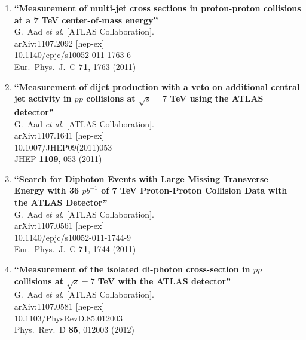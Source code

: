 \documentclass{article}
\begin{document}
\begin{enumerate}
\item%
{\bf ``Measurement of multi-jet cross sections in proton-proton collisions at a 7 TeV center-of-mass energy''}
  \\{}G.~Aad {\it et al.}  [ATLAS Collaboration].
  \\{}arXiv:1107.2092 [hep-ex]
    \\{}10.1140/epjc/s10052-011-1763-6
\\{}Eur.\ Phys.\ J.\ C {\bf 71}, 1763 (2011) %


\item%
{\bf ``Measurement of dijet production with a veto on additional central jet activity in $pp$ collisions at $\sqrt{s}=7$ TeV using the ATLAS detector''}
  \\{}G.~Aad {\it et al.}  [ATLAS Collaboration].
  \\{}arXiv:1107.1641 [hep-ex]
    \\{}10.1007/JHEP09(2011)053
\\{}JHEP {\bf 1109}, 053 (2011) %


\item%
{\bf ``Search for Diphoton Events with Large Missing Transverse Energy with 36 $pb^{-1}$ of 7 TeV Proton-Proton Collision Data with the ATLAS Detector''}
  \\{}G.~Aad {\it et al.}  [ATLAS Collaboration].
  \\{}arXiv:1107.0561 [hep-ex]
    \\{}10.1140/epjc/s10052-011-1744-9
\\{}Eur.\ Phys.\ J.\ C {\bf 71}, 1744 (2011) %


\item%
{\bf ``Measurement of the isolated di-photon cross-section in $pp$ collisions at $\sqrt{s}=7$ TeV with the ATLAS detector''}
  \\{}G.~Aad {\it et al.}  [ATLAS Collaboration].
  \\{}arXiv:1107.0581 [hep-ex]
    \\{}10.1103/PhysRevD.85.012003
\\{}Phys.\ Rev.\ D {\bf 85}, 012003 (2012) %



\end{enumerate}
\end{document}
